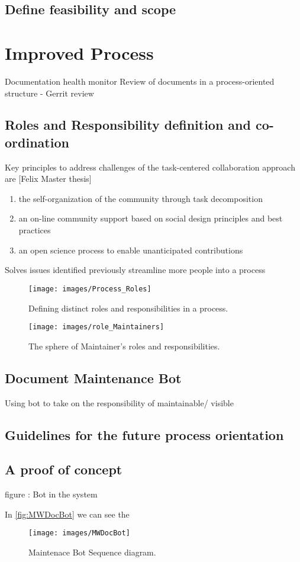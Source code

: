 \subsection{Define feasibility and scope}


\section{Improved Process}
Documentation health monitor
Review of documents in a process-oriented structure - Gerrit review 

\subsection{Roles and Responsibility definition and co-ordination}

Key principles to address challenges of the task-centered collaboration approach are [Felix Master thesis]


\begin{enumerate}
\item the self-organization of the community through task decomposition
\item an on-line community support based on social design principles and best practices
\item an open science process to enable unanticipated contributions
\end{enumerate}

\indent Solves issues identified previously
streamline more people into a process
\begin{figure}[H]
  \centering
  \texttt{[image: images/Process\_Roles]}
  \caption[Defining distinct roles and responsibilities in a process]{Defining distinct roles and responsibilities in a process.}\label{fig:Process_Roles}
\end{figure}
\begin{figure}[H]
  \centering
  \texttt{[image: images/role\_Maintainers]}
  \caption[The sphere of Maintainer's roles and responsibilities]{The sphere of Maintainer's roles and responsibilities.}\label{fig:role_Maintainers}
\end{figure}

\subsection{Document Maintenance Bot}
Using bot to take on the responsibility of 
maintainable/ visible

\subsection{Guidelines for the future process orientation}

\subsection{A proof of concept}
figure : Bot in the system

In \autoref{fig:MWDocBot}  we can see the 
\begin{figure}[H]
  \centering
  \texttt{[image: images/MWDocBot]}
  \caption[Maintenace Bot Sequence diagram]{Maintenace Bot Sequence diagram.}\label{fig:MWDocBot}
\end{figure}